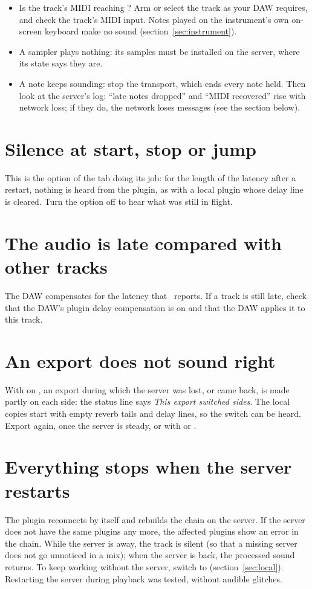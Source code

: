 \begin{itemize}
  \item Is the track's MIDI reaching ? Arm or
    select the track as your DAW requires, and check the track's MIDI
    input. Notes played on the instrument's own on-screen keyboard make no
    sound (section~\ref{sec:instrument}).
  \item A sampler plays nothing: its samples must be installed on the
    server, where its state says they are.
  \item A note keeps sounding: stop the transport, which ends every note
    held. Then look at the server's log: ``late notes dropped'' and ``MIDI
    recovered'' rise with network loss; if they do, the network loses
    messages (see the section below).
\end{itemize}

\section{Silence at start, stop or jump}

This is the  option of the
 tab doing its job: for the length of the latency after a
restart, nothing is heard from the plugin, as with a local plugin whose delay
line is cleared. Turn the option off to hear what was still in flight.

\section{The audio is late compared with other tracks}

The DAW compensates for the latency that \fxme\ reports. If a track is
still late, check that the DAW's plugin delay compensation is on and that
the DAW applies it to this track.

\section{An export does not sound right}

With  on , an export during which the server was
lost, or came back, is made partly on each side: the status line says
\emph{This export switched sides}. The local copies start with empty
reverb tails and delay lines, so the switch can be heard. Export again,
once the server is steady, or with  or .

\section{Everything stops when the server restarts}

The plugin reconnects by itself and rebuilds the chain on the server. If the
server does not have the same plugins any more, the affected plugins show an
error in the chain. While the server is away, the track is silent (so that a missing server does not go unnoticed in a mix); when the server is back, the processed sound returns. To keep working without the server, switch  to  (section~\ref{sec:local}). Restarting the server during playback was tested, without audible glitches.
